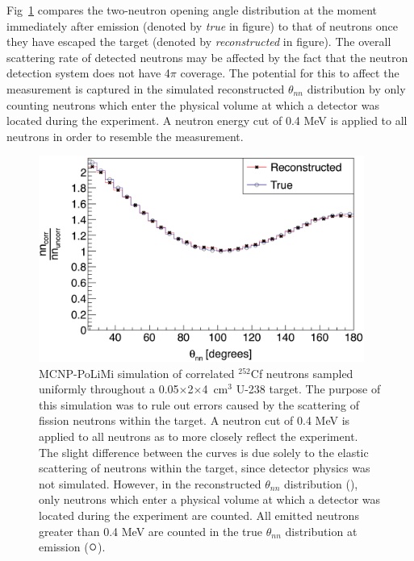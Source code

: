 Fig~\ref{fig:ElasticScatteringEffect} compares the two-neutron opening angle distribution at the moment immediately after emission (denoted by \emph{true} in figure) to that of neutrons once they have escaped the target (denoted by \emph{reconstructed} in figure).
The overall scattering rate of detected neutrons may be affected by the fact that the neutron detection system does not have 4$\pi$ coverage. 
The potential for this to affect the measurement is captured in the simulated reconstructed $\theta_{nn}$ distribution by only counting neutrons which enter the physical volume at which a detector was located during the experiment.
A neutron energy cut of 0.4 MeV is applied to all neutrons in order to resemble the measurement.
\begin{figure}
    \centering
    \includegraphics[width = 0.95\textwidth]{Content/Errors/EffectOfElasticScattering.png}
    \caption{MCNP-PoLiMi simulation of correlated $^{252}$Cf neutrons sampled uniformly throughout a 0.05$\times$2$\times$4~cm$^3$ U-238 target.
    The purpose of this simulation was to rule out errors caused by the scattering of fission neutrons within the target.
    A neutron cut of 0.4 MeV is applied to all neutrons as to more closely reflect the experiment.
    The slight difference between the curves is due solely to the elastic scattering of neutrons within the target, since detector physics was not simulated.
    However, in the reconstructed $\theta_{nn}$ distribution ({\tiny {}}), only neutrons which enter a physical volume at which a detector was located during the experiment are counted.
    All emitted neutrons greater than 0.4 MeV are counted in the true $\theta_{nn}$ distribution at emission ($\mathlarger{\mathlarger{\mathlarger{\circ}}}$).
    }
    \label{fig:ElasticScatteringEffect}
\end{figure}


